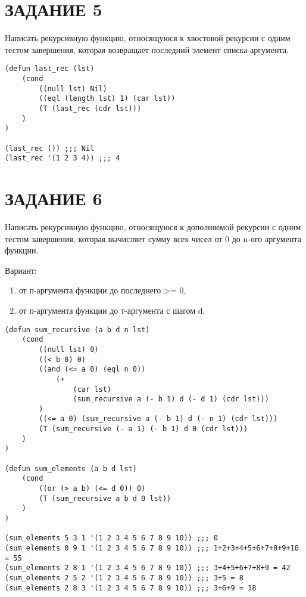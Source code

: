 \section{ЗАДАНИЕ 5}

Написать рекурсивную функцию, относящуюся к хвостовой рекурсии
с одним тестом завершения, которая возвращает последний элемент
списка-аргумента.

\begin{lstlisting}
(defun last_rec (lst)
    (cond
        ((null lst) Nil)
        ((eql (length lst) 1) (car lst))
        (T (last_rec (cdr lst)))
    )
)

(last_rec ()) ;;; Nil
(last_rec '(1 2 3 4)) ;;; 4
\end{lstlisting}

\section{ЗАДАНИЕ 6}

Написать рекурсивную функцию, относящуюся к дополняемой рекурсии с
одним тестом завершения, которая вычисляет сумму всех чисел
от 0 до n-ого аргумента функции.

Вариант:

\begin{enumerate}
    \item от п-аргумента функции до последнего >= 0,
    \item от п-аргумента функции до т-аргумента с шагом d.
\end{enumerate}

\begin{lstlisting}
(defun sum_recursive (a b d n lst)
    (cond
        ((null lst) 0)
        ((< b 0) 0)
        ((and (<= a 0) (eql n 0))
            (+
                (car lst)
                (sum_recursive a (- b 1) d (- d 1) (cdr lst)))
        )
        ((<= a 0) (sum_recursive a (- b 1) d (- n 1) (cdr lst)))
        (T (sum_recursive (- a 1) (- b 1) d 0 (cdr lst)))
    )
)

(defun sum_elements (a b d lst)
    (cond
        ((or (> a b) (<= d 0)) 0)
        (T (sum_recursive a b d 0 lst))
    )
)

(sum_elements 5 3 1 '(1 2 3 4 5 6 7 8 9 10)) ;;; 0
(sum_elements 0 9 1 '(1 2 3 4 5 6 7 8 9 10)) ;;; 1+2+3+4+5+6+7+8+9+10 = 55
(sum_elements 2 8 1 '(1 2 3 4 5 6 7 8 9 10)) ;;; 3+4+5+6+7+8+9 = 42
(sum_elements 2 5 2 '(1 2 3 4 5 6 7 8 9 10)) ;;; 3+5 = 8
(sum_elements 2 8 3 '(1 2 3 4 5 6 7 8 9 10)) ;;; 3+6+9 = 18
\end{lstlisting}

